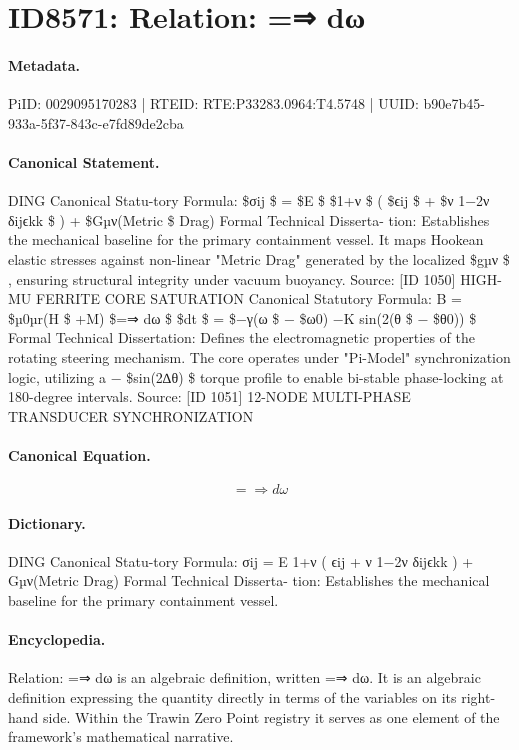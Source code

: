 \section*{ID8571: Relation: =⇒ dω}
\paragraph{Metadata.}
PiID: 0029095170283 | RTEID: RTE:P33283.0964:T4.5748 | UUID: b90e7b45-933a-5f37-843c-e7fd89de2cba

\paragraph{Canonical Statement.}
DING Canonical Statu-tory Formula: \$σij \$ = \$E \$ \$1+ν \$ ( \$ϵij \$ + \$ν 1−2ν δijϵkk \$ ) + \$Gµν(Metric \$ Drag) Formal Technical Disserta- tion: Establishes the mechanical baseline for the primary containment vessel. It maps Hookean elastic stresses against non-linear "Metric Drag" generated by the localized \$gµν \$ , ensuring structural integrity under vacuum buoyancy. Source: [ID 1050] HIGH-MU FERRITE CORE SATURATION Canonical Statutory Formula: B = \$µ0µr(H \$ +M) \$=⇒ dω \$ \$dt \$ = \$−γ(ω \$ − \$ω0) −K sin(2(θ \$ − \$θ0)) \$ Formal Technical Dissertation: Defines the electromagnetic properties of the rotating steering mechanism. The core operates under "Pi-Model" synchronization logic, utilizing a − \$sin(2∆θ) \$ torque profile to enable bi-stable phase-locking at 180-degree intervals. Source: [ID 1051] 12-NODE MULTI-PHASE TRANSDUCER SYNCHRONIZATION

\paragraph{Canonical Equation.}
\[
=⇒ dω
\]

\paragraph{Dictionary.}
DING Canonical Statu-tory Formula: σij = E 1+ν ( ϵij + ν 1−2ν δijϵkk ) + Gµν(Metric Drag) Formal Technical Disserta- tion: Establishes the mechanical baseline for the primary containment vessel.

\paragraph{Encyclopedia.}
Relation: =⇒ dω is an algebraic definition, written =⇒ dω. It is an algebraic definition expressing the quantity directly in terms of the variables on its right-hand side. Within the Trawin Zero Point registry it serves as one element of the framework's mathematical narrative.

